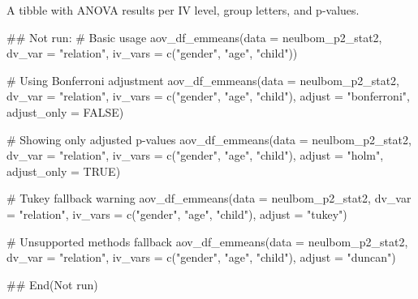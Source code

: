 \documentclass[a4paper]{book}
\begin{document}
%
\begin{Value}
A tibble with ANOVA results per IV level, group letters, and p-values.
\end{Value}
%
\begin{Examples}
\begin{ExampleCode}
\#\# Not run: 
# Basic usage
aov_df_emmeans(data = neulbom_p2_stat2,
               dv_var = "relation",
               iv_vars = c("gender", "age", "child"))

# Using Bonferroni adjustment
aov_df_emmeans(data = neulbom_p2_stat2,
               dv_var = "relation",
               iv_vars = c("gender", "age", "child"),
               adjust = "bonferroni", adjust_only = FALSE)

# Showing only adjusted p-values
aov_df_emmeans(data = neulbom_p2_stat2,
               dv_var = "relation",
               iv_vars = c("gender", "age", "child"),
               adjust = "holm", adjust_only = TRUE)

# Tukey fallback warning
aov_df_emmeans(data = neulbom_p2_stat2,
               dv_var = "relation",
               iv_vars = c("gender", "age", "child"),
               adjust = "tukey")

# Unsupported methods fallback
aov_df_emmeans(data = neulbom_p2_stat2,
               dv_var = "relation",
               iv_vars = c("gender", "age", "child"),
               adjust = "duncan")

## End(Not run)
\end{ExampleCode}
\end{Examples}
\end{document}
